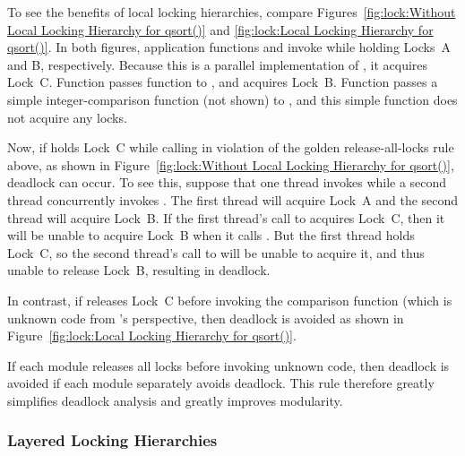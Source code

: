 To see the benefits of local locking hierarchies, compare
Figures~\ref{fig:lock:Without Local Locking Hierarchy for qsort()} and
\ref{fig:lock:Local Locking Hierarchy for qsort()}.
In both figures, application functions  and 
invoke  while holding Locks~A and B, respectively.
Because this is a parallel implementation of , it acquires
Lock~C.
Function  passes function  to ,
and  acquires Lock~B.
Function  passes a simple integer-comparison function (not
shown) to , and this simple function does not acquire any
locks.

Now, if  holds Lock~C while calling  in violation
of the golden release-all-locks rule above, as shown in
Figure~\ref{fig:lock:Without Local Locking Hierarchy for qsort()},
deadlock can occur.
To see this, suppose that one thread invokes  while a second
thread concurrently invokes .
The first thread will acquire Lock~A and the second thread will acquire
Lock~B.
If the first thread's call to  acquires Lock~C, then it
will be unable to acquire Lock~B when it calls .
But the first thread holds Lock~C, so the second thread's call to
 will be unable to acquire it, and thus unable to release
Lock~B, resulting in deadlock.

In contrast, if  releases Lock~C before invoking the
comparison function (which is unknown code from 's perspective,
then deadlock is avoided as shown in
Figure~\ref{fig:lock:Local Locking Hierarchy for qsort()}.

If each module releases all locks before invoking unknown code, then
deadlock is avoided if each module separately avoids deadlock.
This rule therefore greatly simplifies deadlock analysis and greatly
improves modularity.

\subsubsection{Layered Locking Hierarchies}
\label{sec:locking:Layered Locking Hierarchies}

